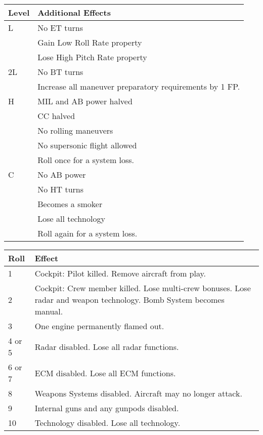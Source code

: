 \documentclass[10pt]{extarticle}
\begin{document}
\begin{table}
\label{table:damage-effects}
\begin{tabular}{lp{7cm}}
\hline
Level&Additional Effects\\
\hline
L
&No ET turns\\
&Gain Low Roll Rate property\\
&Lose High Pitch Rate property\\
\hline
2L
&No BT turns\\
&Increase all maneuver preparatory requirements by 1 FP.\\
\hline
H
&MIL and AB power halved\\
&CC halved\\
&No rolling maneuvers\\
&No supersonic flight allowed\\
&Roll once for a system loss.\\
\hline
C
&No AB power\\
&No HT turns\\
&Becomes a smoker\\
&Lose all technology\\
&Roll again for a system loss.\\
\hline
\end{tabular}
\end{table}

\begin{table}
\label{table:system-loss}
\begin{tabular}{lp{7cm}}
\hline
Roll&Effect\\
\hline
1& Cockpit: Pilot killed. Remove aircraft from play.\\
2& Cockpit: Crew member killed. Lose multi-crew
bonuses. Lose radar and weapon technology.
Bomb System becomes manual.\\
3& One engine permanently flamed out.\\
4 or 5& Radar disabled. Lose all radar functions.\\
6 or 7& ECM disabled. Lose all ECM functions.\\
8& Weapons Systems disabled. Aircraft may no longer
attack.\\
9& Internal guns and any gunpods disabled.\\
10& Technology disabled. Lose all technology.\\
\hline
\end{tabular}
\end{table}
\end{document}
